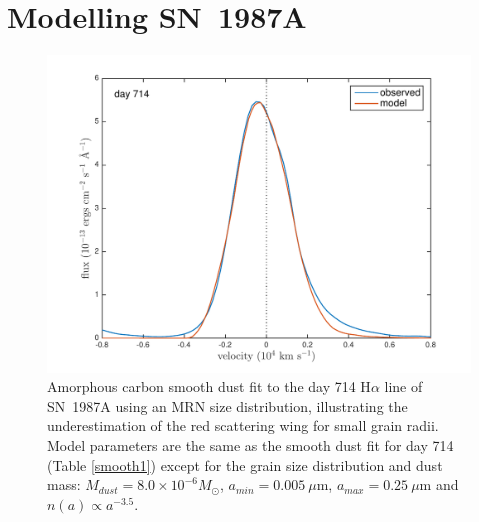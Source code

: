 \section{Modelling SN~1987A}
\label{results}
\begin{figure}
\centering
\includegraphics[trim =33 10 45 15,clip=true,scale=0.7]{chapters/chapter5/images/smooth/d714Ha_smooth_amC_MRN.pdf}
\caption{Amorphous carbon smooth dust fit to the day 714 H$\alpha$ 
line of SN~1987A using an MRN size distribution,
illustrating the underestimation of the red scattering wing for small 
grain radii.  Model parameters are the same as the smooth dust fit for 
day 714 (Table \ref{smooth1}) except for the 
grain size distribution and dust mass:  $M_{dust}=8.0 \times 10^{-6} 
M_{\odot}$, $a_{min}=0.005~\mu$m, $a_{max}=0.25~\mu$m and $n(a) \propto 
a^{-3.5}$.}
\label{MRN}

\end{figure}

